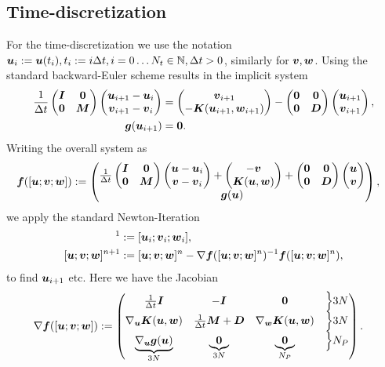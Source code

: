 \subsection{Time-discretization}
For the time-discretization we use the notation $\vu_i := \vu(t_i), t_i := i\Delta t, i=0\ldots N_t\in\N, \Delta t > 0$, similarly for $\vv,\vw$.
Using the standard backward-Euler scheme results in the implicit system
\begin{align}
	\frac{1}{\Delta t}\m{\vI & \vnull\\ \vnull & \vM}\m{\vu_{i+1}-\vu_i\\\vv_{i+1}-\vv_i} 
	&= \m{\vv_{i+1}\\-\vK(\vu_{i+1},\vw_{i+1})} - \m{\vnull &\vnull\\ \vnull &\vD \\}\m{\vu_{i+1} \\ \vv_{i+1}},\\
	\vg(\vu_{i+1})		&= \vnull.
\end{align}
Writing the overall system as 
\begin{align}
	\vf([\vu; \vv; \vw]) &:= \m{\frac{1}{\Delta t}\m{\vI & \vnull\\ \vnull & \vM}\m{\vu-\vu_i\\\vv-\vv_i} 
	+ \m{-\vv\\\vK(\vu,\vw)} + \m{\vnull &\vnull\\ \vnull &\vD \\}\m{\vu \\ \vv}\\
		\vg(\vu)},
\end{align}
we apply the standard Newton-Iteration
\begin{align}
	[\vu; \vv; \vw]^1 &:= [\vu_i; \vv_i; \vw_i],\\
	[\vu; \vv; \vw]^{n+1} &:= [\vu; \vv; \vw]^{n} - \nabla \vf([\vu; \vv; \vw]^n)^{-1}\vf([\vu; \vv; \vw]^n), 
\end{align}
to find $\vu_{i+1}$ etc.
Here we have the Jacobian
\begin{align}
	 \nabla \vf([\vu; \vv; \vw]) &:= \m{\frac{1}{\Delta t} \vI & -\vI & \vnull & \Bigl\rbrace3N\\
	 									\nabla_{\vu}\vK(\vu,\vw) & \frac{1}{\Delta t}\vM+\vD & \nabla_{\vw}\vK(\vu,\vw) & \Bigl\rbrace3N\\
	 									\underbrace{\nabla_{\vu}\vg(\vu)}_{3N} & \underbrace{\vnull}_{3N} & \underbrace{\vnull}_{N_P} & \Bigl\rbrace N_P}.
\end{align}

